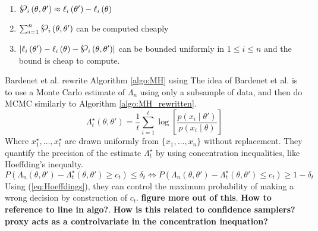 \documentclass{article}
\theoremstyle{definition}
\newcommand{\powerset}{\raisebox{.15\baselineskip}{\Large\ensuremath{\wp}}}
\begin{document}
\begin{enumerate}
    \item $\powerset_i\left(\theta, \theta'\right) \approx \ell_i\left(\theta'\right) - \ell_i\left(\theta\right)$
    \item $ \sum_{i = 1}^n \powerset_i\left(\theta, \theta'\right)$ can be computed cheaply
    \item $\left| \ell_i\left(\theta'\right) - \ell_i\left(\theta\right) - \powerset_i\left(\theta, \theta'\right)\right|$ can be bounded uniformly in $1\leq i \leq n$ and the bound is cheap to compute. 
\end{enumerate}

Bardenet et al. rewrite Algorithm \ref{algo:MH} using 
The idea of Bardenet et al. \cite{Bardenet:2} is to use a Monte Carlo estimate of $\Lambda_n$ using only a subsample of data,  and then do MCMC similarly to Algorithm \ref{algo:MH_rewritten}. 
\begin{equation*}
    \Lambda^{\star}_t\left(\theta, \theta'\right) = \frac{1}{t}\sum_{i = 1}^t \log\left[\frac{p\left(x_i\mid\theta'\right)}{p\left(x_i\mid \theta\right)}\right] 
\end{equation*}
Where $x^{\star}_1, \ldots, x^{\star}_t$ are drawn uniformly from $\{x_1, \ldots, x_n\}$ without replacement.  They quantify the precision of the estimate $\Lambda_t^{\star}$ by using concentration inequalities, like Hoeffding's inequalty.  \begin{equation}\label{eq:Hoeffdings}
    P\left(\Lambda_n \left(\theta, \theta'\right) - \Lambda_t^{\star}\left(\theta, \theta'\right) \geq c_t \right) \leq \delta_t \iff P\left(\Lambda_n\left(\theta, \theta'\right) - \Lambda_t^{\star}\left(\theta, \theta'\right) \leq c_t\right) \geq 1 - \delta_t 
\end{equation}
Using (\ref{eq:Hoeffdings}), they can control the maximum probability of making a wrong decision by construction of $c_t$.  \textbf{figure more out of this}. \textbf{How to reference to line in algo?}. 
\textbf{How is this related to confidence samplers?} \textbf{proxy acts as a controlvariate in the concentration inequation?}
\end{document}
